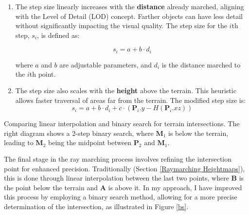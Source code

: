 \begin{enumerate}
    \item The step size linearly increases with the \textbf{distance} already marched, aligning with the Level of Detail (LOD) concept. Farther objects can have less detail without significantly impacting the visual quality. The step size for the $i$th step, $s_i$, is defined as:

   \begin{equation}
   s_{i} = a + b \cdot d_i
   \end{equation}
   
   where $a$ and $b$ are adjustable parameters, and $d_i$ is the distance marched to the $i$th point.

    \item The step size also scales with the \textbf{height} above the terrain. This heuristic allows faster traversal of areas far from the terrain. The modified step size is:
    \begin{equation}
    s_{i} = a + b \cdot d_{i} + c \cdot (\mathbf{P}_i.y - H(\mathbf{P}_i.xz))
    \end{equation}

\end{enumerate}

{Comparing linear interpolation and binary search for terrain intersections. The right diagram shows a 2-step binary search, where $\mathbf{M}_1$ is below the terrain, leading to $\mathbf{M}_2$ being the midpoint between $\mathbf{P}_2$ and $\mathbf{M}_1$. }{}

The final stage in the ray marching process involves refining the intersection point for enhanced precision. Traditionally (Section \ref{Raymarching Heightmaps}), this is done through linear interpolation between the last two points, where  $\mathbf{B}$ is the point below the terrain and $\mathbf{A}$ is above it. In my approach, I have improved this process by employing a binary search method, allowing for a more precise determination of the intersection, as illustrated in Figure \ref{bs}.


